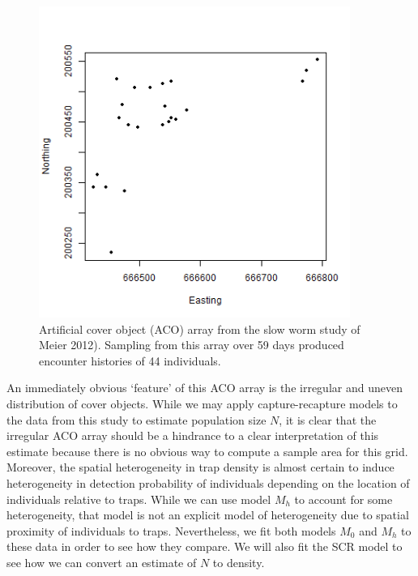 \documentclass{book}
\begin{document}
\begin{figure}[h]
\centering
\includegraphics[height=4in,width=4in]{traps.png}
\caption{
Artificial cover object (ACO) array from the slow worm study of Meier
2012).  Sampling from this array over 59 days produced encounter
histories of 44 individuals.
}
\label{fig.fig1}
\end{figure}

An immediately obvious `feature' of this ACO array is the irregular
and uneven distribution of cover objects.  While we may apply
capture-recapture models to the data from this study to estimate
population size $N$, it is clear that the irregular ACO array should
be a hindrance to a clear interpretation of this estimate because
there is no obvious way to compute a sample area for this
grid. Moreover, the spatial heterogeneity in trap density is almost
certain to induce heterogeneity in detection probability of
individuals depending on the location of individuals relative to
traps. While we can use model $M_h$ to account for some heterogeneity,
that model is not an explicit model of heterogeneity due to spatial
proximity of individuals to traps. Nevertheless, we fit both models
$M_0$ and $M_h$ to these data in order to see how they compare.  We
will also fit the SCR model to see how we can convert an estimate of
$N$ to density.
\end{document}
